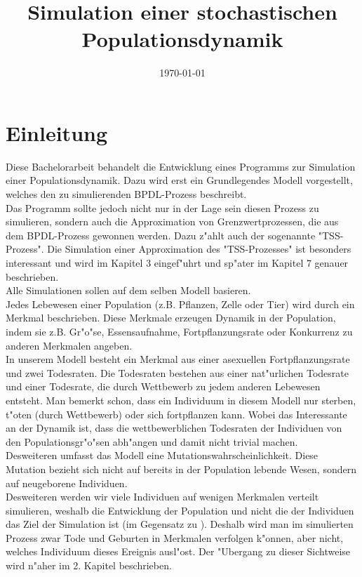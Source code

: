 \documentclass[11pt, a4paper, german]{article}
\date{\today}
\title{Simulation einer stochastischen Populationsdynamik}
\theoremstyle{plain}
\begin{document}
\maketitle
\setcounter{tocdepth}{2}
\tableofcontents


\clearpage
\section{Einleitung}
Diese Bachelorarbeit behandelt die Entwicklung eines Programms zur Simulation einer Populationsdynamik. Dazu wird erst ein Grundlegendes Modell vorgestellt, welches den zu simulierenden BPDL-Prozess beschreibt.\\
Das Programm sollte jedoch nicht nur in der Lage sein diesen Prozess zu simulieren, sondern auch die Approximation von Grenzwertprozessen, die aus dem BPDL-Prozess gewonnen werden. Dazu z"ahlt auch der sogenannte "{}TSS-Prozess"{}. Die Simulation einer Approximation des "{}TSS-Prozesses"{} ist besonders interessant und wird im Kapitel 3 eingef"uhrt und sp"ater im Kapitel 7 genauer beschrieben.\\
Alle Simulationen sollen auf dem selben Modell basieren.\\
Jedes Lebewesen einer Population (z.B. Pflanzen, Zelle oder Tier) wird durch ein Merkmal beschrieben. Diese Merkmale erzeugen Dynamik in der Population, indem sie z.B. Gr"o"se, Essensaufnahme, Fortpflanzungsrate oder Konkurrenz zu anderen Merkmalen angeben.\\
In unserem Modell besteht ein Merkmal aus einer asexuellen Fortpflanzungsrate und zwei Todesraten. Die Todesraten bestehen aus einer nat"urlichen Todesrate und einer Todesrate, die durch Wettbewerb zu jedem anderen Lebewesen entsteht. Man bemerkt schon, dass ein Individuum in diesem Modell nur sterben, t"oten (durch Wettbewerb) oder sich fortpflanzen kann. Wobei das Interessante an der Dynamik ist, dass die wettbewerblichen Todesraten der Individuen von den Populationsgr"o"sen abh"angen und damit nicht trivial machen.\\
Desweiteren umfasst das Modell eine Mutationswahrscheinlichkeit. Diese Mutation bezieht sich nicht auf bereits in der Population lebende Wesen, sondern auf neugeborene Individuen.\\
Desweiteren werden wir viele Individuen auf wenigen Merkmalen verteilt simulieren, weshalb die Entwicklung der Population und nicht die der Individuen das Ziel der Simulation ist (im Gegensatz zu \cite{fournier2004microscopic}). Deshalb wird man im simulierten Prozess zwar Tode und Geburten in Merkmalen verfolgen k"onnen, aber nicht, welches Individuum dieses Ereignis ausl"ost. Der "Ubergang zu dieser Sichtweise wird n"aher im 2. Kapitel beschrieben.\\
\end{document}
